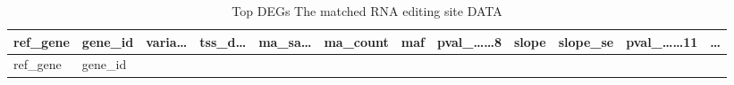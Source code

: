 \documentclass[
]{article}
\begin{document}
\begin{longtable}[]{@{}llllllllllll@{}}
\caption{\label{tab:Top-DEGs-The-matched-RNA-editing-site-DATA}Top DEGs The matched RNA editing site DATA}\tabularnewline
\toprule
\begin{minipage}[b]{0.06\columnwidth}\raggedright
ref\_gene\strut
\end{minipage} & \begin{minipage}[b]{0.06\columnwidth}\raggedright
gene\_id\strut
\end{minipage} & \begin{minipage}[b]{0.06\columnwidth}\raggedright
varia\ldots{}\strut
\end{minipage} & \begin{minipage}[b]{0.06\columnwidth}\raggedright
tss\_d\ldots{}\strut
\end{minipage} & \begin{minipage}[b]{0.06\columnwidth}\raggedright
ma\_sa\ldots{}\strut
\end{minipage} & \begin{minipage}[b]{0.06\columnwidth}\raggedright
ma\_count\strut
\end{minipage} & \begin{minipage}[b]{0.06\columnwidth}\raggedright
maf\strut
\end{minipage} & \begin{minipage}[b]{0.08\columnwidth}\raggedright
pval\_\ldots\ldots8\strut
\end{minipage} & \begin{minipage}[b]{0.06\columnwidth}\raggedright
slope\strut
\end{minipage} & \begin{minipage}[b]{0.06\columnwidth}\raggedright
slope\_se\strut
\end{minipage} & \begin{minipage}[b]{0.09\columnwidth}\raggedright
pval\_\ldots\ldots11\strut
\end{minipage} & \begin{minipage}[b]{0.02\columnwidth}\raggedright
\ldots{}\strut
\end{minipage}\tabularnewline
\midrule
\endfirsthead
\toprule
\begin{minipage}[b]{0.06\columnwidth}\raggedright
ref\_gene\strut
\end{minipage} & \begin{minipage}[b]{0.06\columnwidth}\raggedright
gene\_id\strut
\end{minipage} & \begin{minipage}[b]{0.06\columnwidth}\raggedright

\end{minipage}
\end{longtable}
\end{document}

